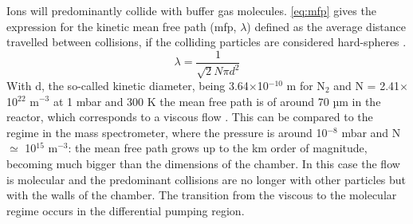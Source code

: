 Ions will predominantly collide with  buffer gas molecules. \autoref{eq:mfp} gives the expression for the kinetic mean free path (\acrshort{mfp}, $\lambda$) defined as the average distance travelled between collisions, if the colliding particles are considered hard-spheres \cite{hirschfelder1954molecular}.
%
\begin{equation}
    \lambda = \frac{1}{\sqrt{2}N\pi d^2}
\label{eq:mfp}
\end{equation}
%
With d, the so-called kinetic diameter, being  3.64$\times$10$^{-10}$ m for N$_2$ and N = 2.41$\times$10$^{22}$ m$^{-3}$ at 1 mbar and 300 K 
the mean free path is of around 70 µm in the reactor, which corresponds to a viscous flow \cite{ismail2015gas}.
%
This can be compared to the regime in the mass spectrometer, where the pressure is around 10$^{-8}$ mbar and N $\simeq$ 10$^{15}$ m$^{-3}$: the mean free path grows up to the km order of magnitude, becoming much bigger than the dimensions of the chamber. In this case the flow is molecular and the predominant collisions are no longer with other particles but with the walls of the chamber.
%
The transition from the viscous to the molecular regime occurs in the differential pumping region.


































